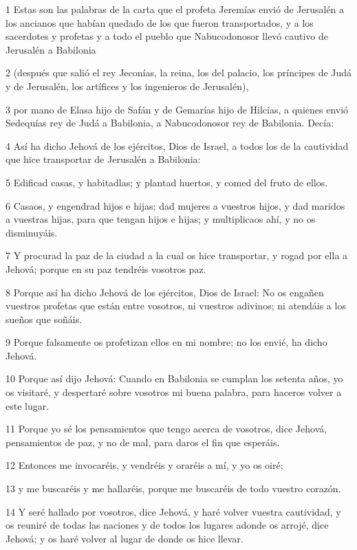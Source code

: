 \par 1 Estas son las palabras de la carta que el profeta Jeremías envió de Jerusalén a los ancianos que habían quedado de los que fueron transportados, y a los sacerdotes y profetas y a todo el pueblo que Nabucodonosor llevó cautivo de Jerusalén a Babilonia
\par 2 (después que salió el rey Jeconías, la reina, los del palacio, los príncipes de Judá y de Jerusalén, los artífices y los ingenieros de Jerusalén), 
\par 3 por mano de Elasa hijo de Safán y de Gemarías hijo de Hilcías, a quienes envió Sedequías rey de Judá a Babilonia, a Nabucodonosor rey de Babilonia. Decía:
\par 4 Así ha dicho Jehová de los ejércitos, Dios de Israel, a todos los de la cautividad que hice transportar de Jerusalén a Babilonia:
\par 5 Edificad casas, y habitadlas; y plantad huertos, y comed del fruto de ellos.
\par 6 Casaos, y engendrad hijos e hijas; dad mujeres a vuestros hijos, y dad maridos a vuestras hijas, para que tengan hijos e hijas; y multiplicaos ahí, y no os disminuyáis.
\par 7 Y procurad la paz de la ciudad a la cual os hice transportar, y rogad por ella a Jehová; porque en su paz tendréis vosotros paz.
\par 8 Porque así ha dicho Jehová de los ejércitos, Dios de Israel: No os engañen vuestros profetas que están entre vosotros, ni vuestros adivinos; ni atendáis a los sueños que soñáis.
\par 9 Porque falsamente os profetizan ellos en mi nombre; no los envié, ha dicho Jehová.
\par 10 Porque así dijo Jehová: Cuando en Babilonia se cumplan los setenta años, yo os visitaré, y despertaré sobre vosotros mi buena palabra, para haceros volver a este lugar.
\par 11 Porque yo sé los pensamientos que tengo acerca de vosotros, dice Jehová, pensamientos de paz, y no de mal, para daros el fin que esperáis.
\par 12 Entonces me invocaréis, y vendréis y oraréis a mí, y yo os oiré;
\par 13 y me buscaréis y me hallaréis, porque me buscaréis de todo vuestro corazón. 
\par 14 Y seré hallado por vosotros, dice Jehová, y haré volver vuestra cautividad, y os reuniré de todas las naciones y de todos los lugares adonde os arrojé, dice Jehová; y os haré volver al lugar de donde os hice llevar.
